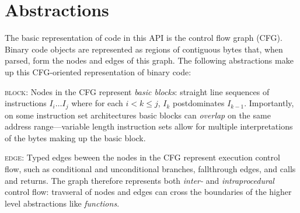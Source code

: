 \section{Abstractions}
\label{sec:abstractions}

The basic representation of code in this API is the control flow graph
(CFG). Binary code objects are represented as regions of contiguous
bytes that, when parsed, form the nodes and edges of this graph. The
following abstractions make up this CFG-oriented representation of
binary code:

%
\begin{itemize}[leftmargin=0pt,label=$\circ$]


{\item {\scshape block}: Nodes in the CFG represent \emph{basic
blocks}: straight line sequences of instructions $I_i \ldots I_j$
where for each $i < k \le j$, $I_k$ postdominates
$I_{k-1}$. Importantly, on some instruction set architectures basic
blocks can \emph{overlap} on the same address range---variable length
instruction sets allow for multiple interpretations of the bytes
making up the basic block.  }

{\item {\scshape edge}: Typed edges beween the nodes in the CFG
represent execution control flow, such as conditional and
unconditional branches, fallthrough edges, and calls and returns. The
graph therefore represents both \emph{inter-} and
\emph{intraprocedural} control flow: travseral of nodes and edges can
cross the boundaries of the higher level abstractions like
\emph{functions}.  }


\end{itemize}
